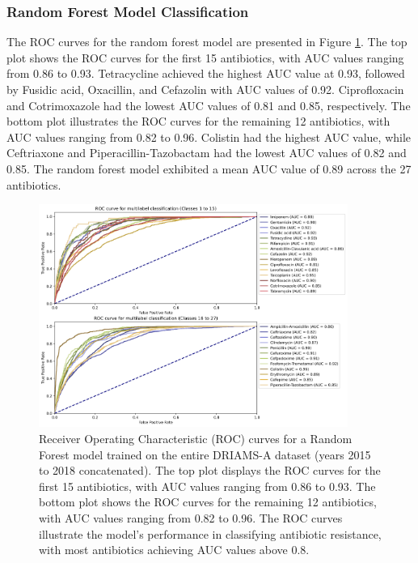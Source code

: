 \documentclass[english,11pt,a4paper,titlepage]{article}
\begin{document}
\subsubsection*{Random Forest Model Classification}
The ROC curves for the random forest model are presented in Figure \ref{fig:ROC_rf}. The top plot shows the ROC curves for the first 15 antibiotics, with AUC values ranging from 0.86 to 0.93. Tetracycline achieved the highest AUC value at 0.93, followed by Fusidic acid, Oxacillin, and Cefazolin with AUC values of 0.92. Ciprofloxacin and Cotrimoxazole had the lowest AUC values of 0.81 and 0.85, respectively. The bottom plot illustrates the ROC curves for the remaining 12 antibiotics, with AUC values ranging from 0.82 to 0.96. Colistin had the highest AUC value, while Ceftriaxone and Piperacillin-Tazobactam had the lowest AUC values of 0.82 and 0.85. The random forest model exhibited a mean AUC value of 0.89 across the 27 antibiotics.
\begin{figure}[h]
	\centering
	\includegraphics[width=0.9\textwidth]{img/ROC_curves_rf.png}
	\caption{Receiver Operating Characteristic (ROC) curves for a Random Forest model trained on the entire DRIAMS-A dataset (years 2015 to 2018 concatenated). The top plot displays the ROC curves for the first 15 antibiotics, with AUC values ranging from 0.86 to 0.93. The bottom plot shows the ROC curves for the remaining 12 antibiotics, with AUC values ranging from 0.82 to 0.96. The ROC curves illustrate the model's performance in classifying antibiotic resistance, with most antibiotics achieving AUC values above 0.8.}
	\label{fig:ROC_rf}
\end{figure}
\end{document}
